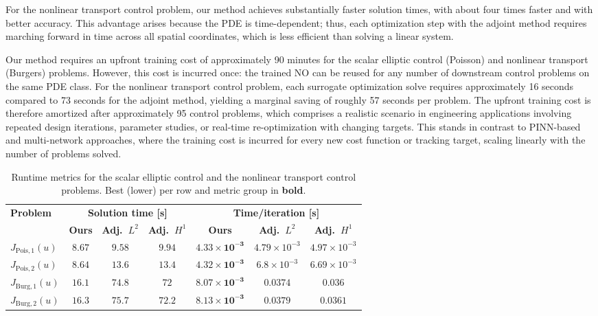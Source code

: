 \documentclass[final,1p,times]{elsarticle}
\theoremstyle{plain} %
\theoremstyle{definition} %
\theoremstyle{remark} %
\begin{document}
For the nonlinear transport control problem, our method achieves substantially faster solution times, with about four times faster and with better accuracy. This advantage arises because the PDE is time-dependent; thus, each optimization step with the adjoint method requires marching forward in time across all spatial coordinates, which is less efficient than solving a linear system.

Our method requires an upfront training cost of approximately 90 minutes for the scalar elliptic control (Poisson) and nonlinear transport (Burgers) problems. However, this cost is incurred once: the trained NO can be reused for any number of downstream control problems on the same PDE class. For the nonlinear transport control problem, each surrogate optimization solve requires approximately 16 seconds compared to 73 seconds for the adjoint method, yielding a marginal saving of roughly 57 seconds per problem. The upfront training cost is therefore amortized after approximately 95 control problems, which comprises a realistic scenario in engineering applications involving repeated design iterations, parameter studies, or real-time re-optimization with changing targets. This stands in contrast to PINN-based and multi-network approaches, where the training cost is incurred for every new cost function or tracking target, scaling linearly with the number of problems solved.

\begin{table}[t]
\centering
\caption{Runtime metrics for the scalar elliptic control and the nonlinear transport control problems. Best (lower) per row and metric group in \textbf{bold}.}
\label{tab:runtime_metrics_pois_burg}
\scriptsize
\setlength{\tabcolsep}{3pt}
\begin{tabular}{lcccccc}
\toprule
\textbf{Problem} & \multicolumn{3}{c}{\textbf{Solution time [s]}} & \multicolumn{3}{c}{\textbf{Time/iteration [s]}} \\
\cmidrule(lr){2-4}\cmidrule(lr){5-7}
 & \textbf{Ours} & \textbf{Adj.\ $L^2$} & \textbf{Adj.\ $H^1$} & \textbf{Ours} & \textbf{Adj.\ $L^2$} & \textbf{Adj.\ $H^1$} \\
\midrule
$J_{\mathrm{Pois},1}(u)$ & $\boldsymbol{8.67}$ & $9.58$ & $9.94$ & $\boldsymbol{4.33\times 10^{-3}}$ & $4.79\times 10^{-3}$ & $4.97\times 10^{-3}$ \\
$J_{\mathrm{Pois},2}(u)$ & $\boldsymbol{8.64}$ & $13.6$ & $13.4$ & $\boldsymbol{4.32\times 10^{-3}}$ & $6.8\times 10^{-3}$ & $6.69\times 10^{-3}$ \\
$J_{\mathrm{Burg},1}(u)$ & $\boldsymbol{16.1}$ & $74.8$ & $72$ & $\boldsymbol{8.07\times 10^{-3}}$ & $0.0374$ & $0.036$ \\
$J_{\mathrm{Burg},2}(u)$ & $\boldsymbol{16.3}$ & $75.7$ & $72.2$ & $\boldsymbol{8.13\times 10^{-3}}$ & $0.0379$ & $0.0361$ \\
\bottomrule
\end{tabular}
\end{table}
\end{document}
